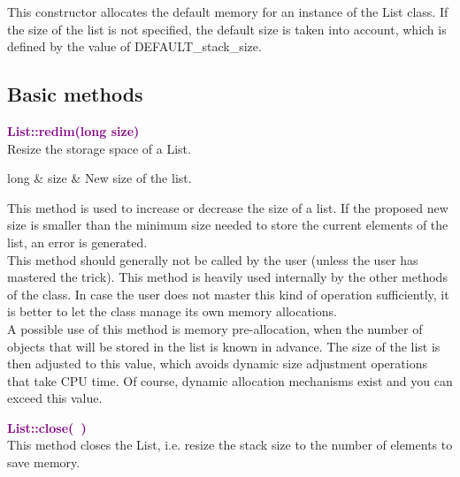 This constructor allocates the default memory for an instance of the List class.
If the size of the list is not specified, the default size is taken into account, which is defined by the value of DEFAULT\_stack\_size.

\subsection{Basic methods}

\textcolor{purple}{\textbf{List::redim(long size)}}\label{List::redim(long size)}\\
Resize the storage space of a List.

\begin{tcolorbox}[width=\textwidth,myArgs,tabularx={ll|R}]
long & size & New size of the list.
\end{tcolorbox}

This method is used to increase or decrease the size of a list.
If the proposed new size is smaller than the minimum size needed to store the current elements of the list, an error is generated.\\
This method should generally not be called by the user (unless the user has mastered the trick).
This method is heavily used internally by the other methods of the class.
In case the user does not master this kind of operation sufficiently, it is better to let the class manage its own memory allocations.\\
A possible use of this method is memory pre-allocation, when the number of objects that will be stored in the list is known in advance.
The size of the list is then adjusted to this value, which avoids dynamic size adjustment operations that take CPU time.
Of course, dynamic allocation mechanisms exist and you can exceed this value.

\textcolor{purple}{\textbf{List::close(~)}}\label{List::close()}\\
This method closes the List, i.e. resize the stack size to the number of elements to save memory.

